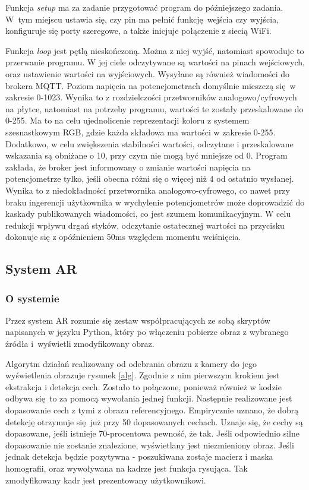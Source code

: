 \documentclass[12pt,twoside,polish]{article}
\begin{document}
Funkcja \emph{setup} ma za zadanie przygotować program do późniejszego zadania. W~tym miejscu ustawia się, czy pin ma pełnić funkcję wejścia czy wyjścia, konfiguruje się porty szeregowe, a także inicjuje połączenie z siecią WiFi.

Funkcja \emph{loop} jest pętlą nieskończoną. Można z niej wyjść, natomiast spowoduje to przerwanie programu. W jej ciele odczytywane są wartości na pinach wejściowych, oraz ustawienie wartości na wyjściowych. Wysyłane są również wiadomości do brokera MQTT. Poziom napięcia na potencjometrach domyślnie mieszczą się w zakresie 0-1023. Wynika to z rozdzielczości przetworników analogowo/cyfrowych na płytce, natomiast na potrzeby programu, wartości te zostały przeskalowane do 0-255. Ma to na celu ujednolicenie reprezentacji koloru z systemem szesnastkowym RGB, gdzie każda składowa ma wartości w zakresie 0-255. Dodatkowo, w celu zwiększenia stabilności wartości, odczytane i przeskalowane wskazania są obniżane o 10, przy czym nie mogą być mniejsze od 0. Program zakłada, że broker jest informowany o zmianie wartości napięcia na potencjometrze tylko, jeśli obecna różni się o więcej niż 4 od ostatnio wysłanej. Wynika to z niedokładności przetwornika analogowo-cyfrowego, co nawet przy braku ingerencji użytkownika w wychylenie potencjometrów może doprowadzić do kaskady publikowanych wiadomości, co jest szumem komunikacyjnym. W celu redukcji wpływu drgań styków, odczytanie ostatecznej wartości na przycisku dokonuje się z opóźnieniem 50ms względem momentu wciśnięcia.

\subsection{System AR}
\subsubsection*{O systemie}
Przez system AR rozumie się zestaw współpracujących ze sobą skryptów napisanych w języku Python, który po włączeniu pobierze obraz z wybranego źródła i~wyświetli zmodyfikowany obraz.

Algorytm działań realizowany od odebrania obrazu z kamery do jego wyświetlenia obrazuje rysunek \ref{alg}. Zgodnie z nim pierwszym krokiem jest ekstrakcja i detekcja cech. Zostało to połączone, ponieważ również w kodzie odbywa się to za pomocą wywołania jednej funkcji. Następnie realizowane jest dopasowanie cech z tymi z obrazu referencyjnego. Empirycznie uznano, że dobrą detekcję otrzymuje się już przy 50 dopasowanych cechach. Uznaje się, że cechy są dopasowane, jeśli istnieje 70-procentowa pewność, że tak. Jeśli odpowiednio silne dopasowanie nie zostanie znalezione, wyświetlany jest niezmieniony obraz. Jeśli jednak detekcja będzie pozytywna - poszukiwana zostaje macierz i maska homografii, oraz wywoływana na kadrze jest funkcja rysująca. Tak zmodyfikowany kadr jest prezentowany użytkownikowi.
\end{document}
